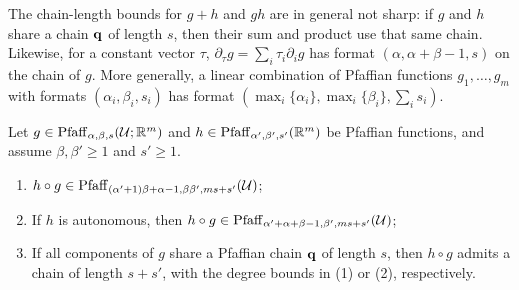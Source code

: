 \begin{remark}\label{re:1}
The chain-length bounds for $g+h$ and $gh$ are in general not sharp: if $g$ and $h$ share a chain $\mathbf{q}$ of length $s$, then their sum and product use that same chain. Likewise, for a constant vector $\tau$, $\partial_\tau g=\sum_i\tau_i\partial_i g$ has format $(\alpha,\alpha+\beta-1,s)$ on the chain of $g$. More generally, a linear combination of Pfaffian functions $g_1,\dots,g_m$ with formats $(\alpha_i,\beta_i,s_i)$ has format $(\max_i\{\alpha_i\},\max_i\{\beta_i\},\sum_i s_i)$.
\end{remark}

\begin{lemma}\label{le:composition}
Let $g\in \mathrm{Pfaff}_{\alpha,\beta,s}(\mathcal{U};\mathbb{R}^m)$ and $h\in \mathrm{Pfaff}_{\alpha',\beta',s'}(\mathbb{R}^m)$ be Pfaffian functions, and assume $\beta,\beta'\ge1$ and $s'\geq 1$.
\begin{enumerate}
\item $h\circ g \in \mathrm{Pfaff}_{(\alpha'+1)\beta+\alpha-1, \beta\beta', ms+s'}(\mathcal{U})$;
\item If $h$ is autonomous, then $h\circ g \in \mathrm{Pfaff}_{\alpha'+\alpha+\beta-1,\beta', ms+s'}(\mathcal{U})$;
\item If all components of $g$ share a Pfaffian chain $\mathbf{q}$ of length $s$, then $h\circ g$ admits a chain of length $s+s'$, with the degree bounds in (1) or (2), respectively.
\end{enumerate}
\end{lemma}

